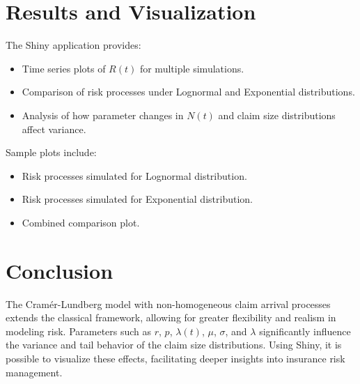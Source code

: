 \documentclass[12pt]{article}
\begin{document}
	\section{Results and Visualization}
	The Shiny application provides:
	\begin{itemize}
		\item Time series plots of $R(t)$ for multiple simulations.
		\item Comparison of risk processes under Lognormal and Exponential distributions.
		\item Analysis of how parameter changes in $N(t)$ and claim size distributions affect variance.
	\end{itemize}
	Sample plots include:
	\begin{itemize}
		\item Risk processes simulated for Lognormal distribution.
		\item Risk processes simulated for Exponential distribution.
		\item Combined comparison plot.
	\end{itemize}
	
	\section{Conclusion}
	The Cram\'er-Lundberg model with non-homogeneous claim arrival processes extends the classical framework, allowing for greater flexibility and realism in modeling risk. Parameters such as $r$, $p$, $\lambda(t)$, $\mu$, $\sigma$, and $\lambda$ significantly influence the variance and tail behavior of the claim size distributions. Using Shiny, it is possible to visualize these effects, facilitating deeper insights into insurance risk management.
	
	
	
\end{document}

